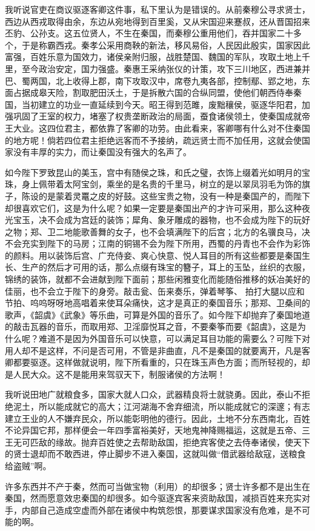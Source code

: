 \documentclass[12pt,UTF-8,openany,a4]{ctexbook}
\begin{document}
\begin{large}\yiwen
    
    我听说官吏在商议驱逐客卿这件事，私下里认为是错误的。从前秦穆公寻求贤士，西边从西戎取得由余，东边从宛地得到百里奚，又从宋国迎来蹇叔，还从晋国招来丕豹、公孙支。这五位贤人，不生在秦国，而秦穆公重用他们，吞并国家二十多个，于是称霸西戎。秦孝公采用商鞅的新法，移风易俗，人民因此殷实，国家因此富强，百姓乐意为国效力，诸侯亲附归服，战胜楚国、魏国的军队，攻取土地上千里，至今政治安定，国力强盛。秦惠王采纳张仪的计策，攻下三川地区，西进兼并巴、蜀两国，北上收得上郡，南下攻取汉中，席卷九夷各部，控制鄢、郢之地，东面占据成皋天险，割取肥田沃土，于是拆散六国的合纵同盟，使他们朝西侍奉秦国，当初建立的功业一直延续到今天。昭王得到范雎，废黜穰侯，驱逐华阳君，加强巩固了王室的权力，堵塞了权贵垄断政治的局面，蚕食诸侯领土，使秦国成就帝王大业。这四位君主，都依靠了客卿的功劳。由此看来，客卿哪有什么对不住秦国的地方呢！倘若四位君主拒绝远客而不予接纳，疏远贤士而不加任用，这就会使国家没有丰厚的实力，而让秦国没有强大的名声了。
    
    如今陛下罗致昆山的美玉，宫中有随侯之珠，和氏之璧，衣饰上缀着光如明月的宝珠，身上佩带着太阿宝剑，乘坐的是名贵的千里马，树立的是以翠凤羽毛为饰的旗子，陈设的是蒙着灵鼍之皮的好鼓。这些宝贵之物，没有一种是秦国产的，而陛下却很喜欢它们，这是为什么呢？如果一定要是秦国出产的才许可采用，那么这种夜光宝玉，决不会成为宫廷的装饰；犀角、象牙雕成的器物，也不会成为陛下的玩好之物；郑、卫二地能歌善舞的女子，也不会填满陛下的后宫；北方的名骥良马，决不会充实到陛下的马房；江南的铜锡不会为陛下所用，西蜀的丹青也不会作为彩饰的颜料。用以装饰后宫、广充侍妾、爽心快意、悦人耳目的所有这些都要是秦国生长、生产的然后才可用的话，那么点缀有珠宝的簪子，耳上的玉坠，丝织的衣服，锦绣的装饰，就都不会进献到陛下面前；那些闲雅变化而能随俗推移的妖冶美好的佳丽，也不会立于陛下的身旁。敲击瓮、缶来奏乐，弹着琴筝、 拍打大腿以应和节拍、呜呜呀呀地高唱着来使耳朵痛快，这才是真正的秦国音乐；那郑、卫桑间的歌声，《韶虞》《武象》等乐曲，可算是外国的音乐了。如今陛下却抛弃了秦国地道的敲击瓦器的音乐，而取用郑、卫淫靡悦耳之音，不要秦筝而要《韶虞》，这是为什么呢？难道不是因为外国音乐可以快意，可以满足耳目功能的需要么？可陛下对用人却不是这样，不问是否可用，不管是非曲直，凡不是秦国的就要离开，凡是客卿都要驱逐。这样做就说明，陛下所看重的，只在珠玉声色方面；而所轻视的，却是人民大众。这不是能用来驾驭天下，制服诸侯的方法啊！
    
    我听说田地广就粮食多，国家大就人口众，武器精良将士就骁勇。因此，泰山不拒绝泥土，所以能成就它的高大；江河湖海不舍弃细流，所以能成就它的深邃；有志建立王业的人不嫌弃民众，所以能彰明他的德行。因此，土地不分东西南北，百姓不论异国它邦，那样便会一年四季富裕美好，天地鬼神降赐福运，这就是五帝、三王无可匹敌的缘故。抛弃百姓使之去帮助敌国，拒绝宾客使之去侍奉诸侯，使天下的贤士退却而不敢西进，停止脚步不进入秦国，这就叫做“借武器给敌寇，送粮食给盗贼”啊。
    
    许多东西并不产于秦，然而可当做宝物（利用）的却很多；贤士许多都不是出生在秦国，然而愿意效忠秦国的却很多。如今驱逐宾客来资助敌国，减损百姓来充实对手，内部自己造成空虚而外部在诸侯中构筑怨恨，那要谋求国家没有危难，是不可能的啊。
    

\end{large}
\end{document}
